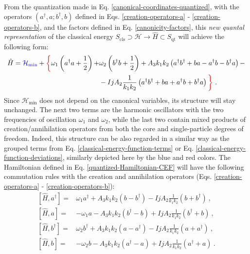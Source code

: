 From the quantization made in Eq. \ref{canonical-coordinates-quantized}, with the operators $(a^\dagger,a;b^\dagger,b)$ defined in Eqs. \ref{creation-operators-a} - \ref{creation-operators-b}, and the factors defined in Eq. \ref{canonicity-factors}, this \emph{new quantal representation} of the classical energy $S_\text{cls}\supset\mathcal{H}\to\hat{H}\subset S_\text{qt}$ will achieve the following form:
\begin{align}
    \hat{H}={\color{blue}\mathcal{H}_\text{min}}+{\color{red}\bigg\{}\omega_1\left(a^\dagger a+\frac{1}{2}\right)+&\omega_2\left(b^\dagger b+\frac{1}{2}\right)+A_3k_1k_2\left(a^\dagger b^\dagger+ba-a^\dagger b-b^\dagger a\right)-\nonumber\\
                                                                                &-IjA_2\frac{1}{k_1k_2}\left(a^\dagger b^\dagger + ba + a^\dagger b + b^\dagger a \right){\color{red}\bigg\}}\ .
    \label{quantized-Hamiltonian-CEF}
\end{align}
Since $\mathcal{H}_\text{min}$ does not depend on the canonical variables, its structure will stay unchanged. The next two terms are the harmonic oscillators with the two frequencies of oscillation $\omega_1$ and $\omega_2$, while the last two contain mixed products of creation/annihilation operators from both the core and single-particle degrees of freedom. Indeed, this structure can be also regarded in a similar way as the grouped terms from Eq. \ref{classical-energy-function-terms} or Eq. \ref{classical-energy-function-deviations}, similarly depicted here by the blue and red colors. The Hamiltonian defined in Eq. \ref{quantized-Hamiltonian-CEF} will have the following commutation rules with the creation and annihilation operators (Eqs. \ref{creation-operators-a} - \ref{creation-operators-b}):
\begin{align}
    \left[\hat{H},a^\dagger\right]=&\omega_1a^\dagger+A_3k_1k_2(b-b^\dagger)-IjA_2\frac{1}{k_1k_2}(b+b^\dagger)\ ,\nonumber\\
    \left[\hat{H},a\right]=&-\omega_1a-A_3k_1k_2(b^\dagger-b)+IjA_2\frac{1}{k_1k_2}(b^\dagger+b)\ ,\nonumber\\
    \left[\hat{H},b^\dagger\right]=&\omega_2b^\dagger+A_3k_1k_2\left(a-a^\dagger\right)-IjA_2\frac{1}{k_1k_2}\left(a+a^\dagger\right)\ ,\nonumber\\
    \left[\hat{H},b\right]=&-\omega_2b-A_3k_1k_2\left(a^\dagger-a\right)+IjA_2\frac{1}{k_1k_2}\left(a^\dagger+a\right)\ .
    \label{H-quantal-linear-system-a-b-operators}
\end{align}

